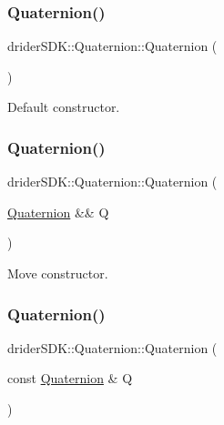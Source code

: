 \subsubsection{\texorpdfstring{Quaternion()}{Quaternion()}\hspace{0.1cm}{\footnotesize\ttfamily [1/4]}}
{\footnotesize\ttfamily drider\+S\+D\+K\+::\+Quaternion\+::\+Quaternion (\begin{DoxyParamCaption}{ }\end{DoxyParamCaption})}

Default constructor. \mbox{\label{classdrider_s_d_k_1_1_quaternion_a644b649dee7047182a31d10d087062ca}} 
\subsubsection{\texorpdfstring{Quaternion()}{Quaternion()}\hspace{0.1cm}{\footnotesize\ttfamily [2/4]}}
{\footnotesize\ttfamily drider\+S\+D\+K\+::\+Quaternion\+::\+Quaternion (\begin{DoxyParamCaption}\item[{\hyperlink{classdrider_s_d_k_1_1_quaternion}{Quaternion} \&\&}]{Q }\end{DoxyParamCaption})\hspace{0.3cm}{\ttfamily [default]}}

Move constructor. \mbox{\label{classdrider_s_d_k_1_1_quaternion_ad90008123c45fcdf2a92ba25028101dd}} 
\subsubsection{\texorpdfstring{Quaternion()}{Quaternion()}\hspace{0.1cm}{\footnotesize\ttfamily [3/4]}}
{\footnotesize\ttfamily drider\+S\+D\+K\+::\+Quaternion\+::\+Quaternion (\begin{DoxyParamCaption}\item[{const \hyperlink{classdrider_s_d_k_1_1_quaternion}{Quaternion} \&}]{Q }\end{DoxyParamCaption})}


